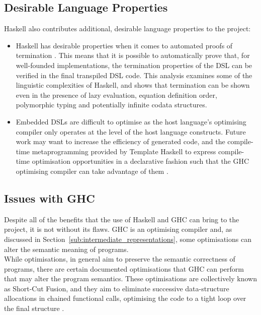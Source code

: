 \subsection{Desirable Language Properties} %
\label{sub:desirable_language_properties}
Haskell also contributes additional, desirable language properties to the project:
\begin{itemize}
    \item Haskell has desirable properties when it comes to automated proofs of termination \citep{Giesl:2011:ATP:1890028.1890030}.
    This means that it is possible to automatically prove that, for well-founded implementations, the termination properties of the DSL can be verified in the final transpiled DSL code. 
    This analysis examines some of the linguistic complexities of Haskell, and shows that termination can be shown even in the presence of lazy evaluation, equation definition order, polymorphic typing and potentially infinite codata structures. 
    \item Embedded DSLs are difficult to optimise as the host language's optimising compiler only operates at the level of the host language constructs. 
    Future work may want to increase the efficiency of generated code, and the compile-time metaprogramming provided by Template Haskell to express compile-time optimisation opportunities in a declarative fashion such that the GHC optimising compiler can take advantage of them \citep{seefried2004optimising}.
\end{itemize}


\subsection{Issues with GHC} %
\label{sub:issues_with_ghc}
Despite all of the benefits that the use of Haskell and GHC can bring to the project, it is not without its flaws.
GHC is an optimising compiler and, as discussed in Section~\ref{sub:intermediate_representations}, some optimisations can alter the semantic meaning of programs.\\

While optimisations, in general aim to preserve the semantic correctness of programs, there are certain documented optimisations that GHC can perform that may alter the program semantics. 
These optimisations are collectively known as Short-Cut Fusion, and they aim to eliminate successive data-structure allocations in chained functional calls, optimising the code to a tight loop over the final structure \citep{HaskellWikiShortCutFusionCorrectness}.\\

